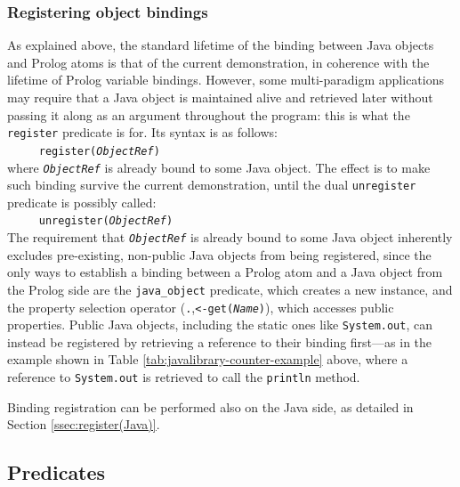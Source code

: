\subsubsection{Registering object bindings}
\label{sssec:register(prolog)}

As explained above, the standard lifetime of the binding between Java objects and Prolog atoms is that of the current demonstration, in coherence with the lifetime of Prolog variable bindings.
However, some multi-paradigm applications may require that a Java object is maintained alive and retrieved later without passing it along as an argument throughout the program: this is what the \texttt{register} predicate is for.
Its syntax is as follows:\\

\texttt{~~~~~register(\textit{ObjectRef})}\\

\noindent where \texttt{\textit{ObjectRef}} is already bound to some Java object. The effect is to make such binding survive the current demonstration, until the dual \texttt{unregister} predicate is possibly called:\\

\texttt{~~~~~unregister(\textit{ObjectRef})}\\

\noindent The requirement that \texttt{\textit{ObjectRef}} is already bound to some Java object inherently excludes pre-existing, non-public Java objects from being registered, since the only ways to establish a binding between a Prolog atom and a Java object from the Prolog side are the \texttt{java\_object} predicate, which creates a new instance, and the property selection operator (\texttt{.},\texttt{<-get(\textit{Name})}), which accesses public properties.
%
Public Java objects, including the static ones like \texttt{System.out}, can instead be registered by retrieving a reference to their binding first---as in the example shown in Table \ref{tab:javalibrary-counter-example} above, where a reference to \texttt{System.out} is retrieved to call the \texttt{println} method.

Binding registration can be performed also on the Java side, as detailed in Section \ref{ssec:register(Java)}.

\subsection{Predicates}
\label{ssec:all-javalibrary-predicates}


